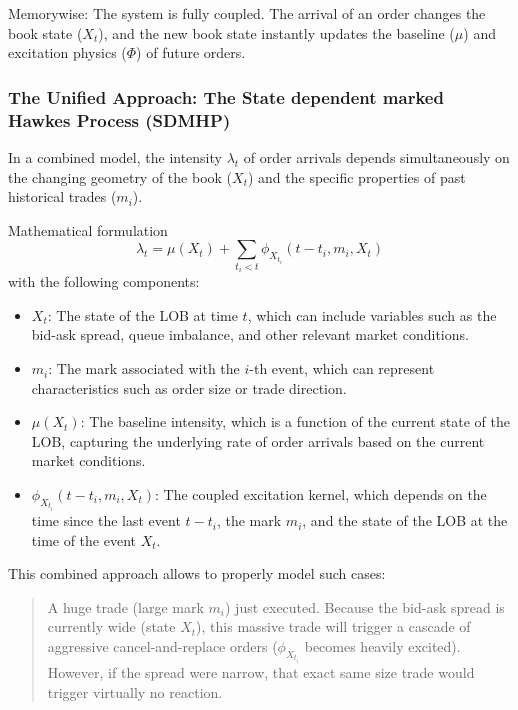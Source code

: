 \documentclass[12pt,a4paper]{cau_thesis}
\begin{document}
Memorywise: The system is fully coupled. The arrival of an order
changes the book state (\(X_{t}\)), and the new book state instantly
updates the baseline (\(\mu \)) and excitation physics (\(\Phi \)) of
future orders.

\subsubsection{The Unified Approach: The State dependent marked Hawkes Process (SDMHP)}\label{sub_sub_sec:the_unified_approach}
In a combined model, the intensity \(\lambda _{t}\) of order arrivals
depends simultaneously on the changing geometry of the book
(\(X_{t}\)) and the specific properties of past historical trades
(\(m_{i}\)).

\begin{paragraph}{Mathematical formulation}
    \begin{equation}
        \lambda_{t} = \mu(X_{t}) + \sum_{t_{i}<t} \phi_{X_{t_{i}}}(t-t_{i}, m_{i}, X_{t})
    \end{equation}
    with the following components:
    \begin{itemize}
        \item \(X_{t}\): The state of the LOB at time \(t\), which can include variables such as the bid-ask spread, queue imbalance, and other relevant market conditions.
        \item \(m_{i}\): The mark associated with the \(i\)-th event, which can represent characteristics such as order size or trade direction.
        \item \(\mu(X_{t})\): The baseline intensity, which is a function of the current state of the LOB, capturing the underlying rate of order arrivals based on the current market conditions.
        \item \(\phi_{X_{t_{i}}}(t-t_{i}, m_{i}, X_{t})\): The coupled excitation kernel, which depends on the time since the last event \(t-t_{i}\), the mark \(m_{i}\), and the state of the LOB at the time of the event \(X_{t}\).
    \end{itemize}
\end{paragraph}

This combined approach allows to properly model such cases:
\begin{quote}
    A huge trade (large mark \(m_{i}\)) just executed. Because
    the bid-ask spread is currently wide (state \(X_{t}\)), this massive
    trade will trigger a cascade of aggressive cancel-and-replace orders
    (\(\phi_{X_{t_{i}}}\) becomes heavily excited). However, if the
    spread were narrow, that exact same size trade would trigger virtually
    no reaction.
\end{quote}
\end{document}

